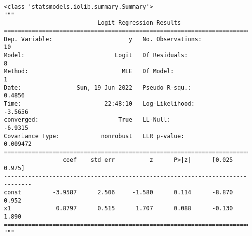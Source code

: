             \begin{tcolorbox}[breakable, size=fbox, boxrule=.5pt, pad at break*=1mm, opacityfill=0]
\begin{Verbatim}[commandchars=\\\{\}]
<class 'statsmodels.iolib.summary.Summary'>
"""
                           Logit Regression Results
==============================================================================
Dep. Variable:                      y   No. Observations:                   10
Model:                          Logit   Df Residuals:                        8
Method:                           MLE   Df Model:                            1
Date:                Sun, 19 Jun 2022   Pseudo R-squ.:                  0.4856
Time:                        22:48:10   Log-Likelihood:                -3.5656
converged:                       True   LL-Null:                       -6.9315
Covariance Type:            nonrobust   LLR p-value:                  0.009472
==============================================================================
                 coef    std err          z      P>|z|      [0.025      0.975]
------------------------------------------------------------------------------
const         -3.9587      2.506     -1.580      0.114      -8.870       0.952
x1             0.8797      0.515      1.707      0.088      -0.130       1.890
==============================================================================
"""
\end{Verbatim}
\end{tcolorbox}
        

    
    
    

